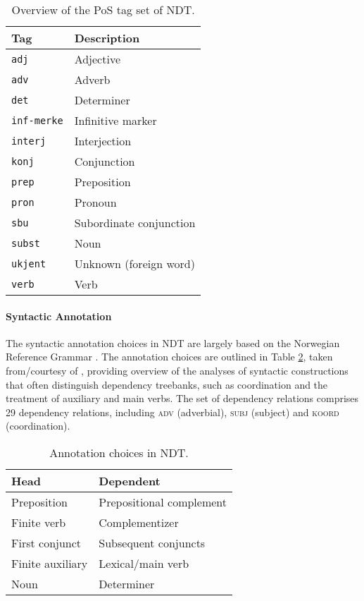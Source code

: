 \documentclass[11pt,a4paper]{article}
\begin{document}
\begin{table}
    \centering
    \begin{tabular}{@{}ll@{}}
        \toprule
        \textbf{Tag} & \textbf{Description} \\
        \midrule
        \texttt{adj} & Adjective \\
        \texttt{adv} & Adverb \\
        \texttt{det} & Determiner\\
        \texttt{inf-merke} & Infinitive marker \\
        \texttt{interj} & Interjection \\
        \texttt{konj} & Conjunction \\
        \texttt{prep} & Preposition \\
        \texttt{pron} & Pronoun \\
        \texttt{sbu} & Subordinate conjunction \\
        \texttt{subst} & Noun \\
        \texttt{ukjent} & Unknown (foreign word) \\
        \texttt{verb} & Verb \\
        \bottomrule
    \end{tabular}
    \caption{Overview of the PoS tag set of NDT.}
    \label{ndttagest}
\end{table}

\paragraph{Syntactic Annotation}
The syntactic annotation choices in NDT are largely based on the Norwegian
Reference Grammar \cite{Faa:Lie:Van:97}. The annotation choices are outlined in
Table \ref{ndtannotation}, taken from/courtesy of ,
providing overview of the analyses of syntactic constructions that often
distinguish dependency treebanks, such as coordination and the treatment of
auxiliary and main verbs. The set of dependency relations comprises 29
dependency relations, including \textsc{adv} (adverbial), \textsc{subj}
(subject) and \textsc{koord} (coordination).

\begin{table} \centering
    \begin{tabular}{@{}ll@{}}
        \toprule
        \textbf{Head} & \textbf{Dependent} \\
        \midrule
        Preposition & Prepositional complement \\
        Finite verb & Complementizer \\
        First conjunct & Subsequent conjuncts \\
        Finite auxiliary & Lexical/main verb \\
        Noun & Determiner \\
        \bottomrule
    \end{tabular}
    \caption{Annotation choices in NDT.}
    \label{ndtannotation}
\end{table}
\end{document}
